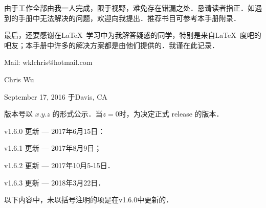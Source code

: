 由于工作全部由我一人完成，限于视野，难免存在错漏之处．恳请读者指正．如遇到的手册中无法解决的问题，欢迎向我提出．推荐书目可参考本手册附录．

最后，还要感谢在\LaTeX\ 学习中为我解答疑惑的同学，特别是来自\LaTeX\ 度吧的吧友；本手册中许多的解决方案都是由他们提供的．我谨在此记录．

\vfill

\begin{flushright} %
Mail: wklchris@hotmail.com\dpar

Chris Wu

September 17, 2016 于Davis, CA
\end{flushright}
\clearpage
{}\dpar\dpar

版本号以 $x.y.z$ 的形式公示．当$z=0$时，为决定正式 release 的版本．

v1.6.0 更新 --- 2017年6月15日：

v1.6.1 更新 --- 2017年8月9日；

v1.6.2 更新 --- 2017年10月5-15日．

v1.6.3 更新 --- 2018年3月22日．\dpar

以下内容中，未以括号注明的项是在v1.6.0中更新的．

